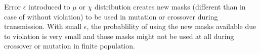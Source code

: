 Error $\epsilon$ introduced to $\mu$ or $\chi$ distribution creates new masks (different than in case of without violation) to be used in mutation or crossover during transmission.
With small $\epsilon$, the probablility of using the new masks available due to violation is very small and those masks might not be used at all during crossover or mutation in finite population.









 
